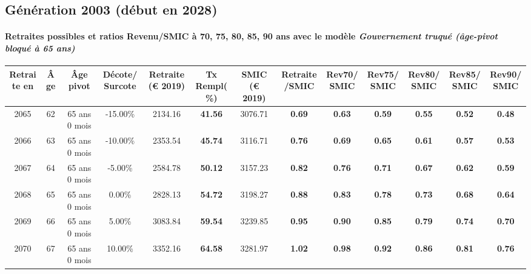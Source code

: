 \newpage 
 
\subsection{Génération 2003 (début en 2028)} 

\paragraph{Retraites possibles et ratios Revenu/SMIC à 70, 75, 80, 85, 90 ans avec le modèle \emph{Gouvernement truqué (âge-pivot bloqué à 65 ans)}}  
 
{ \scriptsize \begin{center} 
\begin{tabular}[htb]{|c|c||c|c||c|c||c||c|c|c|c|c|c|} 
\hline 
 Retraite en &  Âge &  Âge pivot &  Décote/Surcote &  Retraite (\euro{} 2019) &  Tx Rempl(\%) &  SMIC (\euro{} 2019) &  Retraite/SMIC &  Rev70/SMIC &  Rev75/SMIC &  Rev80/SMIC &  Rev85/SMIC &  Rev90/SMIC \\ 
\hline \hline 
 2065 &  62 &  65 ans 0 mois &  -15.00\% &  2134.16 &  {\bf 41.56} &  3076.71 &  {\bf {\color{red} 0.69}} &  {\bf {\color{red} 0.63}} &  {\bf {\color{red} 0.59}} &  {\bf {\color{red} 0.55}} &  {\bf {\color{red} 0.52}} &  {\bf {\color{red} 0.48}} \\ 
\hline 
 2066 &  63 &  65 ans 0 mois &  -10.00\% &  2353.54 &  {\bf 45.74} &  3116.71 &  {\bf {\color{red} 0.76}} &  {\bf {\color{red} 0.69}} &  {\bf {\color{red} 0.65}} &  {\bf {\color{red} 0.61}} &  {\bf {\color{red} 0.57}} &  {\bf {\color{red} 0.53}} \\ 
\hline 
 2067 &  64 &  65 ans 0 mois &  -5.00\% &  2584.78 &  {\bf 50.12} &  3157.23 &  {\bf {\color{red} 0.82}} &  {\bf {\color{red} 0.76}} &  {\bf {\color{red} 0.71}} &  {\bf {\color{red} 0.67}} &  {\bf {\color{red} 0.62}} &  {\bf {\color{red} 0.59}} \\ 
\hline 
 2068 &  65 &  65 ans 0 mois &  0.00\% &  2828.13 &  {\bf 54.72} &  3198.27 &  {\bf {\color{red} 0.88}} &  {\bf {\color{red} 0.83}} &  {\bf {\color{red} 0.78}} &  {\bf {\color{red} 0.73}} &  {\bf {\color{red} 0.68}} &  {\bf {\color{red} 0.64}} \\ 
\hline 
 2069 &  66 &  65 ans 0 mois &  5.00\% &  3083.84 &  {\bf 59.54} &  3239.85 &  {\bf {\color{red} 0.95}} &  {\bf {\color{red} 0.90}} &  {\bf {\color{red} 0.85}} &  {\bf {\color{red} 0.79}} &  {\bf {\color{red} 0.74}} &  {\bf {\color{red} 0.70}} \\ 
\hline 
 2070 &  67 &  65 ans 0 mois &  10.00\% &  3352.16 &  {\bf 64.58} &  3281.97 &  {\bf 1.02} &  {\bf {\color{red} 0.98}} &  {\bf {\color{red} 0.92}} &  {\bf {\color{red} 0.86}} &  {\bf {\color{red} 0.81}} &  {\bf {\color{red} 0.76}} \\ 
\hline 
\hline 
\end{tabular} 
\end{center} } 
